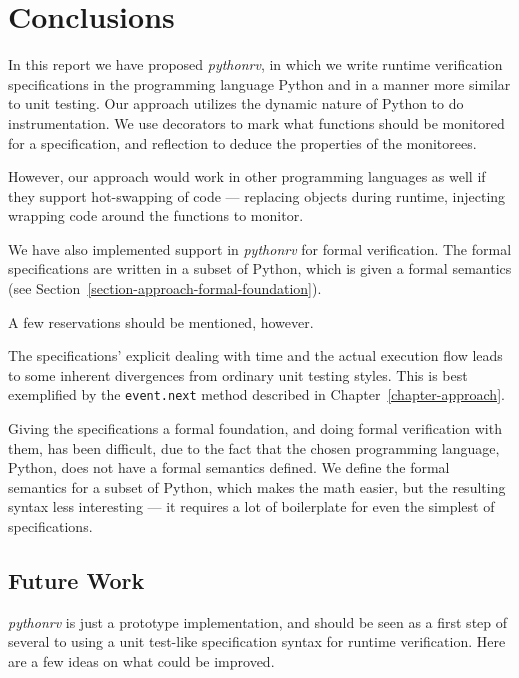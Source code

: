 
\pagestyle{newchap}
\chapter{Conclusions} \label{chapter-conclusions}

In this report we have proposed \textit{pythonrv}, in which we write runtime
verification specifications in the programming language Python and in a manner
more similar to unit testing. Our approach utilizes the dynamic nature of
Python to do instrumentation. We use decorators to mark what functions should
be monitored for a specification, and reflection to deduce the properties of
the monitorees.

However, our approach would work in other programming languages as well if they
support hot-swapping of code --- replacing objects during runtime, injecting
wrapping code around the functions to monitor.

We have also implemented support in \textit{pythonrv} for formal verification.
The formal specifications are written in a subset of Python, which is given a
formal semantics (see Section~\ref{section-approach-formal-foundation}).

A few reservations should be mentioned, however.

The specifications' explicit dealing with time and the actual execution flow
leads to some inherent divergences from ordinary unit testing styles. This is
best exemplified by the \texttt{event.next} method described in
Chapter~\ref{chapter-approach}.

Giving the specifications a formal foundation, and doing formal verification
with them, has been difficult, due to the fact that the chosen programming
language, Python, does not have a formal semantics defined. We define the
formal semantics for a subset of Python, which makes the math easier, but the
resulting syntax less interesting --- it requires a lot of boilerplate for even
the simplest of specifications.


\section{Future Work}

\textit{pythonrv} is just a prototype implementation, and should be seen as a
first step of several to using a unit test-like specification syntax for
runtime verification. Here are a few ideas on what could be improved.

